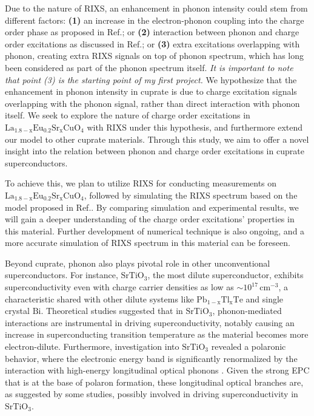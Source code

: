 \documentclass[11pt]{article}
\begin{document}
Due to the nature of RIXS, an enhancement in phonon intensity could stem from different factors: \textbf{(1)} an increase in the electron-phonon coupling into the charge order phase as proposed in Ref.\cite{wang_charge_2021,peng_electronic_2022}; or \textbf{(2)} interaction between phonon and charge order excitations as discussed in Ref.\cite{li_multiorbital_2020, chaix_dispersive_2017,huang_quantum_2021}; or \textbf{(3)} extra excitations overlapping with phonon, creating extra RIXS signals on top of phonon spectrum, which has long been considered as part of the phonon spectrum itself. \textit{It is important to note that point (3) is the starting point of my first project.} We hypothesize that the enhancement in phonon intensity in cuprate is due to charge excitation signals overlapping with the phonon signal, rather than direct interaction with phonon itself.  We seek to explore the nature of charge order excitations in $\mathrm{La_{1.8-x}Eu_{0.2}Sr_xCuO_{4}}$ with RIXS under this hypothesis, and furthermore extend our model to other cuprate materials. Through this study, we aim to offer a novel insight into the relation between phonon and charge order excitations in cuprate superconductors. 

To achieve this, we plan to utilize RIXS for conducting measurements on $\mathrm{La_{1.8-x}Eu_{0.2}Sr_xCuO_{4}}$, followed by simulating the RIXS spectrum based on the model proposed in Ref.\cite{devereaux_directly_2016}. By comparing simulation and experimental results, we will gain a deeper understanding of the charge order excitations' properties in this material. Further development of numerical technique is also ongoing, and a more accurate simulation of RIXS spectrum in this material can be foreseen.

Beyond cuprate, phonon also plays pivotal role in other unconventional superconductors. For instance, $\mathrm{SrTiO_{3}}$, the most dilute superconductor, exhibits superconductivity even with charge carrier densities as low as $\sim 10^{17}\,\mathrm{cm^{-3}}$\cite{schooley_superconductivity_1964,lin_fermi_2013}, a characteristic shared with other dilute systems like $\mathrm{Pb_{1-x}Tl_{x}Te}$\cite{known} and single crystal $\mathrm{Bi}$\cite{prakash_evidence_2017}. Theoretical studies suggested that in $\mathrm{SrTiO_{3}}$, phonon-mediated interactions are instrumental in driving superconductivity, notably causing an increase in superconducting transition temperature as the material becomes more electron-dilute\cite{gastiasoro_phonon-mediated_2019}.
Furthermore, investigation into $\mathrm{SrTiO_{3}}$ revealed a polaronic behavior, where the electronic energy band is significantly renormalized by the interaction with high-energy longitudinal optical phonons \cite{swartz_polaronic_2018, geondzhian_large_2020}.
Given the strong EPC that is at the base of polaron formation, these longitudinal optical branches are, as suggested by some studies\cite{}, possibly involved in driving superconductivity in $\mathrm{SrTiO_{3}}$.
\end{document}
